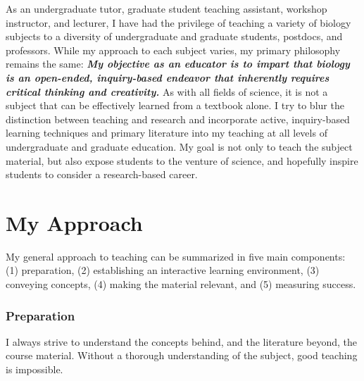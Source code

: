 As an undergraduate tutor, graduate student teaching assistant, workshop
instructor, and lecturer,
I have had the privilege of teaching a variety of biology subjects to a
diversity of undergraduate and graduate students, postdocs, and professors.
While my approach to each subject varies, my primary philosophy remains the
same:
\textbf{\textit{My objective as an educator is to impart that biology is an
open-ended, inquiry-based endeavor that inherently requires critical thinking
and creativity.}}
As with all fields of science, it is not a subject that can be effectively
learned from a textbook alone.
I try to blur the distinction between teaching and research and incorporate
active, inquiry-based learning techniques and primary literature into my
teaching at all levels of undergraduate and graduate education.
My goal is not only to teach the subject material, but also expose students to
the venture of science, and hopefully inspire students to consider a
research-based career. 

\section*{My Approach}
My general approach to teaching can be summarized in five main components:
(1) preparation,
(2) establishing an interactive learning environment,
(3) conveying concepts,
(4) making the material relevant,
and
(5) measuring success.

\subsubsection*{Preparation}
I always strive to understand the concepts behind, and the literature beyond,
the course material.
Without a thorough understanding of the subject, good teaching is impossible.

